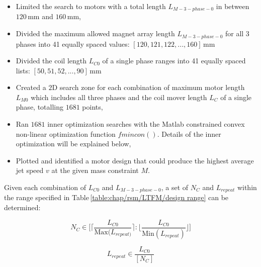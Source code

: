                 
                \begin{itemize}
                    \item   Limited the search to motors with a total length $L_{M-3-phase-0}$ in between $120\,\mathrm{mm}$ and $160\,\mathrm{mm}$,
                    \item   Divided the maximum allowed magnet array length $L_{M-3-phase-0}$ for all 3 phases into 41 equally spaced values: $[120, 121, 122, ..., 160]\,\mathrm{mm}$ 
                    \item   Divided the coil length $L_{C0}$ of a single phase ranges into 41 equally spaced lists:  $[50, 51, 52, ..., 90]\,\mathrm{mm}$ 
                    \item   Created a $\mathrm{2D}$ search zone for each combination of maximum motor length $L_{M0}$ which includes all three phases and the coil mover length $L_{C}$ of a single phase, totalling $1681$ points,
                    \item   Ran $1681$ inner optimization searches with the Matlab constrained convex non-linear optimization function $fmincon()$. Details of the inner optimization will be explained below,
                    \item   Plotted and identified a motor design that could produce the highest average jet speed $v$ at the given mass constraint $M$.
                \end{itemize}
                
                

                
                
                Given each combination of $L_{C0}$ and $L_{M-3-phase-0}$, a set of $N_C$ and $L_{repeat}$ within the range specified in Table\,\ref{table:chap/rsm/LTFM/design range} can be determined:
                
                
                \begin{equation}
                    N_C \in \Bigg[\bigg\lceil {\frac{L_{C0}}{\mathrm{Max}(L_{repeat)}}} \bigg\rceil:\bigg\lfloor{\frac{L_{C0}}{\mathrm{Min}(L_{repeat})}}\bigg\rfloor\Bigg] 
                    \label{eq:chap/rsm/LTFM/list of N_C}
                \end{equation}
            
                
                \begin{equation}
                    L_{repeat} \in \frac{L_{C0}}{[N_C]}
                    \label{eq:chap/rsm/LTFM/list of L_repeat}
                \end{equation}
                
